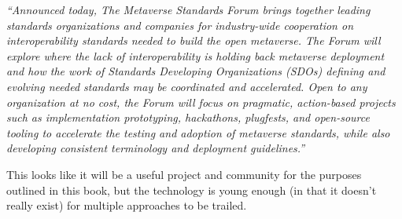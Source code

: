 \textit{``Announced today, The Metaverse Standards Forum brings together leading standards organizations and companies for industry-wide cooperation on interoperability standards needed to build the open metaverse. The Forum will explore where the lack of interoperability is holding back metaverse deployment and how the work of Standards Developing Organizations (SDOs) defining and evolving needed standards may be coordinated and accelerated. Open to any organization at no cost, the Forum will focus on pragmatic, action-based projects such as implementation prototyping, hackathons, plugfests, and open-source tooling to accelerate the testing and adoption of metaverse standards, while also developing consistent terminology and deployment guidelines.''}\par
This looks like it will be a useful project and community for the purposes outlined in this book, but the technology is young enough (in that it doesn't really exist) for multiple approaches to be trailed.
